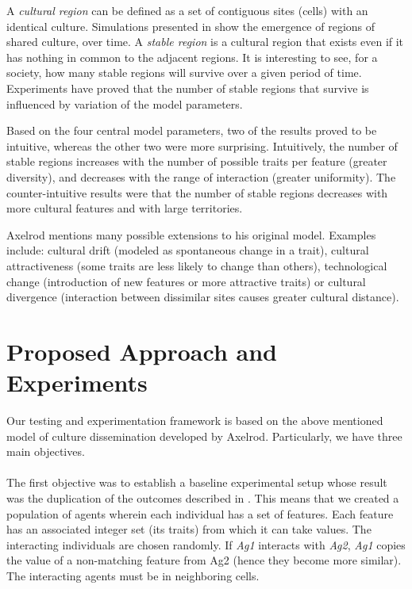 \documentclass[twoside, 11pt, a4paper]{article}
\begin{document}
A \emph{cultural region} can be defined as a set of contiguous sites (cells) with an identical culture. Simulations presented in \cite{Axelrod} show the emergence of regions of shared culture, over time. 
A \emph{stable region} is a cultural region that exists even if it has nothing in common to the adjacent regions. It is interesting to see, for a society, how many stable regions will survive over a given period of time. Experiments have proved that the number of stable regions that survive is influenced by variation of the model parameters.

Based on the four central model parameters, two of the results proved to be intuitive, whereas the other two were more surprising. Intuitively, the number of stable regions increases with the number of possible traits per feature (greater diversity), and decreases with the range of interaction (greater uniformity). The counter-intuitive results were that the number of stable regions decreases with more cultural features and with large territories.

Axelrod mentions many possible extensions to his original model. Examples include: cultural drift (modeled as spontaneous change in a trait), cultural attractiveness (some traits are less likely to change than others), technological change (introduction of new features or more attractive traits) or cultural divergence (interaction between dissimilar sites causes greater cultural distance).

\section{Proposed Approach and Experiments}

Our testing and experimentation framework is based on the above mentioned model of culture dissemination developed by Axelrod. Particularly, we have three main objectives.

\paragraph*{}The first objective was to establish a baseline experimental setup whose result was the duplication of the outcomes described in \cite{Axelrod}. This means that we created a population of agents wherein each individual has a set of features. Each feature has an associated integer set (its traits) from which it can take values. The interacting individuals are chosen randomly. If \textit{Ag1} interacts with \textit{Ag2}, \textit{Ag1} copies the value of a non-matching feature from Ag2 (hence they become more similar). The interacting agents must be in neighboring cells.
\end{document}
